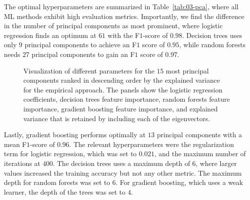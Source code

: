 \documentclass[superscriptaddress,unsortedaddress,
 amsmath,amssymb,
 aps,
]{revtex4-2}
\begin{document}
The optimal hyperparameters are summarized in Table~\ref{tab:03-pca}, where all ML methods exhibit high evaluation metrics. Importantly, we find the difference in the number of principal components as most prominent, where logistic regression finds an optimum at $61$ with the F$1$-score of $0.98$. Decision trees uses only $9$ principal components to achieve an F$1$ score of $0.95$, while random forests needs $27$ principal components to gain an F$1$ score of $0.97$.

\begin{figure}[ht!]
  \begin{subfigure}[b]{0.5\textwidth}
    \centering
    
    \label{fig:03-fi-a}
  \end{subfigure}%
  
  \begin{subfigure}[b]{0.5\textwidth}
    \centering
    
    \label{fig:03-fi-b}
  \end{subfigure}%
  
  \begin{subfigure}[b]{0.5\textwidth}
    \centering
    
    \label{fig:03-fi-c}
  \end{subfigure}%
  
  \begin{subfigure}[b]{0.5\textwidth}
    \centering
    
    \label{fig:03-fi-d}
  \end{subfigure}%
  
  \begin{subfigure}[b]{0.5\textwidth}
    \centering
    
    \label{fig:03-fi-e}
  \end{subfigure}%
  
  \caption{Visualization of different parameters for the $15$ most principal components ranked in descending order by the explained variance for the empirical approach. The panels show the logistic regression coefficients, decision trees feature importance, random forests feature importance, gradient boosting feature importance, and explained variance that is retained by including each of the eigenvectors. }
  \label{fig:03-fi}
\end{figure}

Lastly, gradient boosting performs optimally at $13$ principal components with a mean F$1$-score of $0.96$. The relevant hyperparameters were the regularization term for logistic regression, which was set to $0.021$, and the maximum number of iterations at $400$. The decision trees uses a maximum depth of $6$, where larger values increased the training accuracy but not any other metric. The maximum depth for  random forests was set to $6$. For gradient boosting, which uses a weak learner, the depth of the trees was set to  $4$. 
\end{document}
